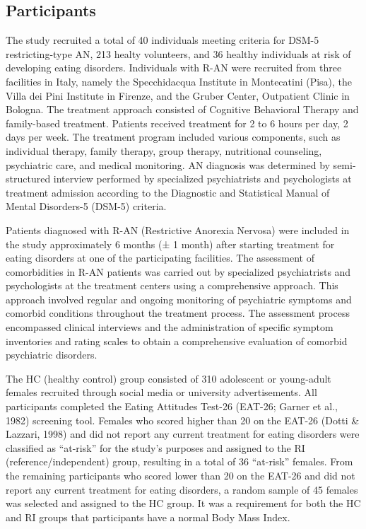 \documentclass[
  man,floatsintext]{apa6}
\begin{document}
\hypertarget{participants}{%
\subsection{Participants}\label{participants}}

The study recruited a total of 40 individuals meeting criteria for DSM-5 restricting-type AN, 213 healty volunteers, and 36 healthy individuals at risk of developing eating disorders. Individuals with R-AN were recruited from three facilities in Italy, namely the Specchidacqua Institute in Montecatini (Pisa), the Villa dei Pini Institute in Firenze, and the Gruber Center, Outpatient Clinic in Bologna. The treatment approach consisted of Cognitive Behavioral Therapy and family-based treatment. Patients received treatment for 2 to 6 hours per day, 2 days per week. The treatment program included various components, such as individual therapy, family therapy, group therapy, nutritional counseling, psychiatric care, and medical monitoring. AN diagnosis was determined by semi-structured interview performed by specialized psychiatrists and psychologists at treatment admission according to the Diagnostic and Statistical Manual of Mental Disorders-5 (DSM-5) criteria.

Patients diagnosed with R-AN (Restrictive Anorexia Nervosa) were included in the study approximately 6 months (± 1 month) after starting treatment for eating disorders at one of the participating facilities. The assessment of comorbidities in R-AN patients was carried out by specialized psychiatrists and psychologists at the treatment centers using a comprehensive approach. This approach involved regular and ongoing monitoring of psychiatric symptoms and comorbid conditions throughout the treatment process. The assessment process encompassed clinical interviews and the administration of specific symptom inventories and rating scales to obtain a comprehensive evaluation of comorbid psychiatric disorders.

The HC (healthy control) group consisted of 310 adolescent or young-adult females recruited through social media or university advertisements. All participants completed the Eating Attitudes Test-26 (EAT-26; Garner et al., 1982) screening tool. Females who scored higher than 20 on the EAT-26 (Dotti \& Lazzari, 1998) and did not report any current treatment for eating disorders were classified as ``at-risk'' for the study's purposes and assigned to the RI (reference/independent) group, resulting in a total of 36 ``at-risk'' females. From the remaining participants who scored lower than 20 on the EAT-26 and did not report any current treatment for eating disorders, a random sample of 45 females was selected and assigned to the HC group. It was a requirement for both the HC and RI groups that participants have a normal Body Mass Index.
\end{document}
